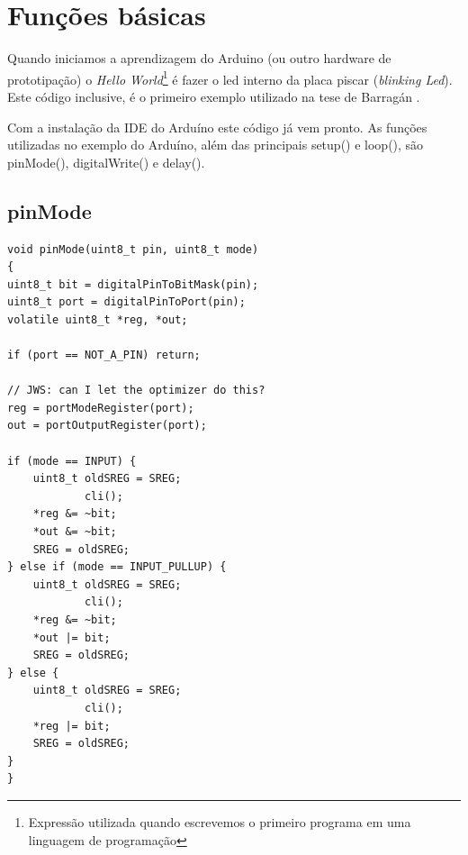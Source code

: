 \section{Funções básicas}

Quando iniciamos a aprendizagem do Arduino (ou outro hardware de prototipação) o \emph{Hello World}\footnote{Expressão utilizada quando escrevemos o primeiro programa em uma linguagem de programação} é fazer o led interno da placa piscar (\emph{blinking Led}). Este código inclusive, é o primeiro exemplo utilizado na tese de Barragán \cite[p.~39]{Barragan2004}. 

Com a instalação da IDE do Arduíno este código já vem pronto. As funções utilizadas no exemplo do Arduíno, além das principais setup() e loop(), são pinMode(), digitalWrite() e delay().\newline

\subsection{pinMode}

 
\begin{lstlisting}
void pinMode(uint8_t pin, uint8_t mode)
{
uint8_t bit = digitalPinToBitMask(pin);
uint8_t port = digitalPinToPort(pin);
volatile uint8_t *reg, *out;

if (port == NOT_A_PIN) return;

// JWS: can I let the optimizer do this?
reg = portModeRegister(port);
out = portOutputRegister(port);

if (mode == INPUT) { 
	uint8_t oldSREG = SREG;
            cli();
	*reg &= ~bit;
	*out &= ~bit;
	SREG = oldSREG;
} else if (mode == INPUT_PULLUP) {
	uint8_t oldSREG = SREG;
            cli();
	*reg &= ~bit;
	*out |= bit;
	SREG = oldSREG;
} else {
	uint8_t oldSREG = SREG;
            cli();
	*reg |= bit;
	SREG = oldSREG;
}
}
\end{lstlisting}

